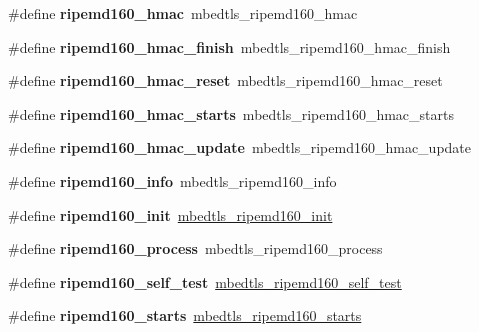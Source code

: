 \begin{DoxyCompactItemize}
\#define {\bfseries ripemd160\+\_\+hmac}~mbedtls\+\_\+ripemd160\+\_\+hmac
\item 
\mbox{\label{compat-1_83_8h_a9a921998933c4df72af4634268680425}} 
\#define {\bfseries ripemd160\+\_\+hmac\+\_\+finish}~mbedtls\+\_\+ripemd160\+\_\+hmac\+\_\+finish
\item 
\mbox{\label{compat-1_83_8h_aedf68c3e5c442b6c0d25262c791cba11}} 
\#define {\bfseries ripemd160\+\_\+hmac\+\_\+reset}~mbedtls\+\_\+ripemd160\+\_\+hmac\+\_\+reset
\item 
\mbox{\label{compat-1_83_8h_a2b775cf8ff55906a55bcbb477c70cd99}} 
\#define {\bfseries ripemd160\+\_\+hmac\+\_\+starts}~mbedtls\+\_\+ripemd160\+\_\+hmac\+\_\+starts
\item 
\mbox{\label{compat-1_83_8h_aebea09f3e025d8577b9694bee8dceabd}} 
\#define {\bfseries ripemd160\+\_\+hmac\+\_\+update}~mbedtls\+\_\+ripemd160\+\_\+hmac\+\_\+update
\item 
\mbox{\label{compat-1_83_8h_a99f806be251ed166acd7ab4171c0d89a}} 
\#define {\bfseries ripemd160\+\_\+info}~mbedtls\+\_\+ripemd160\+\_\+info
\item 
\mbox{\label{compat-1_83_8h_a0bbe693369a84bd6d9a9b1546c1da557}} 
\#define {\bfseries ripemd160\+\_\+init}~\mbox{\hyperlink{ripemd160_8h_a650a9d62b92a35fbb461e10c5d11c546}{mbedtls\+\_\+ripemd160\+\_\+init}}
\item 
\mbox{\label{compat-1_83_8h_af1ef0fe9d590fb92ae1a0d9ed3b6e45e}} 
\#define {\bfseries ripemd160\+\_\+process}~mbedtls\+\_\+ripemd160\+\_\+process
\item 
\mbox{\label{compat-1_83_8h_aff63a2a1b37339ca17cd0b28b0cbbc35}} 
\#define {\bfseries ripemd160\+\_\+self\+\_\+test}~\mbox{\hyperlink{ripemd160_8h_a416da55879d0ab7366514a9dc75a9443}{mbedtls\+\_\+ripemd160\+\_\+self\+\_\+test}}
\item 
\mbox{\label{compat-1_83_8h_a5253452524797621b2abf983a276007d}} 
\#define {\bfseries ripemd160\+\_\+starts}~\mbox{\hyperlink{ripemd160_8h_a7c7ddc9200313207235753d1667e141e}{mbedtls\+\_\+ripemd160\+\_\+starts}}

\end{DoxyCompactItemize}
